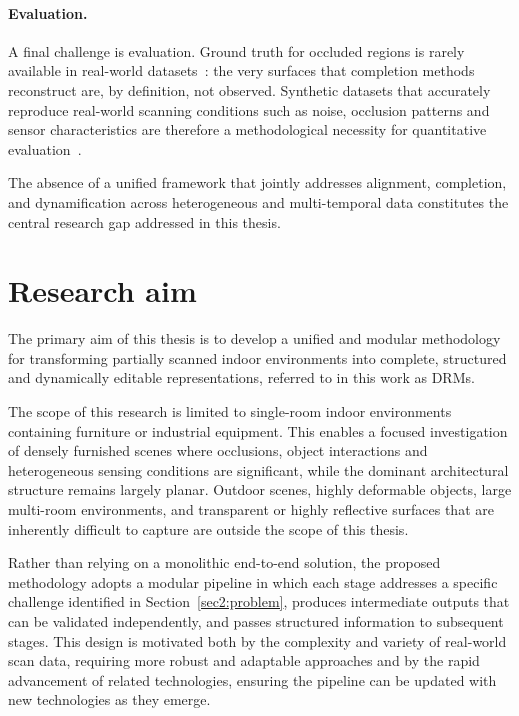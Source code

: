 \paragraph{Evaluation.}
A final challenge is evaluation. Ground truth for occluded regions is rarely available in real-world datasets~\cite{dai_scannet_2017, chang_matterport3d_2017}: the very surfaces that completion methods reconstruct are, by definition, not observed. Synthetic datasets that accurately reproduce real-world scanning conditions such as noise, occlusion patterns and sensor characteristics are therefore a methodological necessity for quantitative evaluation~\cite{de_geyter_automated_2022, vermandere_synthetic_2026}.
 
The absence of a unified framework that jointly addresses alignment, completion, and dynamification across heterogeneous and multi-temporal data constitutes the central research gap addressed in this thesis.

 
\section{Research aim}
\label{sec3:researchaim}

The primary aim of this thesis is to develop a unified and modular methodology for transforming partially scanned indoor environments into complete, structured and dynamically editable representations, referred to in this work as \gls{DRM}s.

The scope of this research is limited to single-room indoor environments containing furniture or industrial equipment. This enables a focused investigation of densely furnished scenes where occlusions, object interactions and heterogeneous sensing conditions are significant, while the dominant architectural structure remains largely planar. Outdoor scenes, highly deformable objects, large multi-room environments, and transparent or highly reflective surfaces that are inherently difficult to capture are outside the scope of this thesis.

Rather than relying on a monolithic end-to-end solution, the proposed methodology adopts a modular pipeline in which each stage addresses a specific challenge identified in Section~\ref{sec2:problem}, produces intermediate outputs that can be validated independently, and passes structured information to subsequent stages. This design is motivated both by the complexity and variety of real-world scan data, requiring more robust and adaptable approaches and by the rapid advancement of related technologies, ensuring the pipeline can be updated with new technologies as they emerge.

